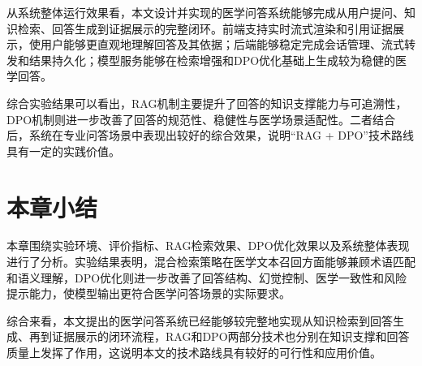 从系统整体运行效果看，本文设计并实现的医学问答系统能够完成从用户提问、知识检索、回答生成到证据展示的完整闭环。前端支持实时流式渲染和引用证据展示，使用户能够更直观地理解回答及其依据；后端能够稳定完成会话管理、流式转发和结果持久化；模型服务能够在检索增强和DPO优化基础上生成较为稳健的医学回答。

综合实验结果可以看出，RAG机制主要提升了回答的知识支撑能力与可追溯性，DPO机制则进一步改善了回答的规范性、稳健性与医学场景适配性。二者结合后，系统在专业问答场景中表现出较好的综合效果，说明“RAG + DPO”技术路线具有一定的实践价值。

\section{本章小结}

本章围绕实验环境、评价指标、RAG检索效果、DPO优化效果以及系统整体表现进行了分析。实验结果表明，混合检索策略在医学文本召回方面能够兼顾术语匹配和语义理解，DPO优化则进一步改善了回答结构、幻觉控制、医学一致性和风险提示能力，使模型输出更符合医学问答场景的实际要求。

综合来看，本文提出的医学问答系统已经能够较完整地实现从知识检索到回答生成、再到证据展示的闭环流程，RAG和DPO两部分技术也分别在知识支撑和回答质量上发挥了作用，这说明本文的技术路线具有较好的可行性和应用价值。
